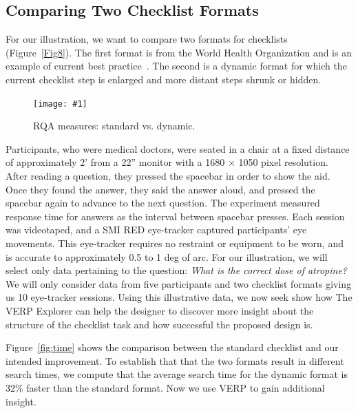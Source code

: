\documentclass{sigchi}
\newcommand{\insertpicture}[2]{\begin{center}\texttt{[image: \#1]}\end{center}}
\begin{document}
\subsection{Comparing Two Checklist Formats} For our illustration, we want
to compare two formats for checklists (Figure~\ref{Fig8}). The first format is from the 
World Health Organization and is an example of current best
practice~\cite{James_2013}.  The second is a dynamic format for which 
the current checklist step is enlarged and more distant steps shrunk 
or hidden\cite{Cirimele_2014}.

\begin{figure}

\insertpicture{figures/rqaComparison.pdf}{0.5}
\caption{RQA measures: standard vs. dynamic.\label{fig:rqacomparison}} 

\end{figure}

Participants, who were medical doctors, were seated in a chair at a fixed
distance of approximately 2' from a 22'' monitor with a 1680 × 1050 pixel
resolution. After reading a question, they pressed the spacebar in order to
show the aid. Once they found the answer, they said the answer aloud, and
pressed the spacebar again to advance to the next question. The experiment
measured response time for answers as the interval between spacebar
presses. Each session was videotaped, and a SMI RED eye-tracker captured
participants’ eye movements. This eye-tracker requires no restraint or
equipment to be worn, and is accurate to approximately 0.5 to 1 deg of arc.
For our illustration, we will select only data pertaining to the question:
\emph{What is the correct dose of atropine?} We will only consider data from
five participants and two checklist formats giving us 10 eye-tracker
sessions. Using this illustrative data, we now seek show how The VERP Explorer can help the designer to discover more
insight about the structure of the checklist task and how successful the
proposed design is. 

Figure~\ref{fig:time} shows the comparison between the standard
checklist and our intended improvement. To establish that that the two formats result in different search times, we compute that the average search time for the dynamic format
is 32\% faster than the standard format. Now we use VERP to gain additional insight.  
\end{document}
